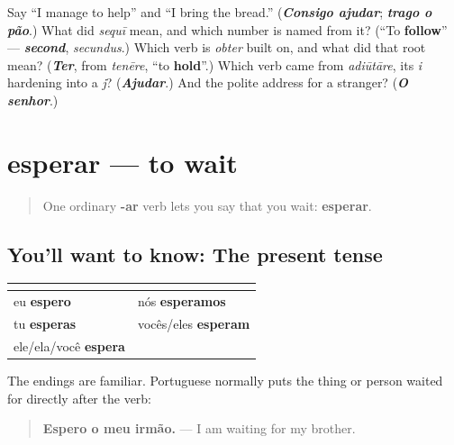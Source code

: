 \begin{tcolorbox}[breakable,colback=teal!4,colframe=teal!35!black,title={Before you move on}]
Say \textquotedblleft{}I manage to help\textquotedblright{} and \textquotedblleft{}I bring the bread.\textquotedblright{} (\emph{\textbf{Consigo ajudar}}; \emph{\textbf{trago o pão}}.) What did \emph{sequī} mean, and which number is named from it? (\textquotedblleft{}To \textbf{follow}\textquotedblright{} — \emph{\textbf{second}}, \emph{secundus}.) Which verb is \emph{obter} built on, and what did that root mean? (\emph{\textbf{Ter}}, from \emph{tenēre}, \textquotedblleft{}to \textbf{hold}\textquotedblright{}.) Which verb came from \emph{adiūtāre}, its \emph{i} hardening into a \emph{j}? (\emph{\textbf{Ajudar}}.) And the polite address for a stranger? (\emph{\textbf{O senhor}}.)
\end{tcolorbox}
\section[esperar]{esperar — to wait}

\label{lesson:PT-C21-esperar}



\begin{quote}
One ordinary \textbf{-ar} verb lets you say that you wait: \textbf{esperar}.
\end{quote}

\subsection*{You'll want to know: The present tense}
\noindent
\begin{tabularx}{\linewidth}{@{}>{\raggedright\arraybackslash}X>{\raggedright\arraybackslash}X@{}}
\toprule
\textbf{} & \textbf{} \\
\midrule
eu \textbf{espero} & nós \textbf{esperamos} \\
tu \textbf{esperas} & vocês/eles \textbf{esperam} \\
ele/ela/você \textbf{espera} &  \\
\bottomrule
\end{tabularx}

The endings are familiar. Portuguese normally puts the thing or person waited for directly after the verb:

\begin{quote}
\textbf{Espero o meu irmão.} — I am waiting for my brother.
\end{quote}

